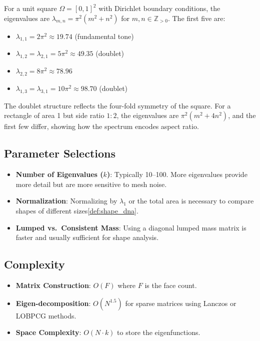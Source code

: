\begin{example}\label{example:shape_dna_square}
For a unit square $\Omega = [0,1]^2$ with Dirichlet boundary conditions, the eigenvalues are $\lambda_{m,n} = \pi^2(m^2 + n^2)$ for $m, n \in \mathbb{Z}_{>0}$. The first five are:
\begin{itemize}
  \item $\lambda_{1,1} = 2\pi^2 \approx 19.74$ (fundamental tone)
  \item $\lambda_{1,2} = \lambda_{2,1} = 5\pi^2 \approx 49.35$ (doublet)
  \item $\lambda_{2,2} = 8\pi^2 \approx 78.96$
  \item $\lambda_{1,3} = \lambda_{3,1} = 10\pi^2 \approx 98.70$ (doublet)
\end{itemize}
The doublet structure reflects the four-fold symmetry of the square. For a rectangle of area 1 but side ratio $1:2$, the eigenvalues are $\pi^2(m^2 + 4n^2)$, and the first few differ, showing how the spectrum encodes aspect ratio.
\end{example}

\subsection{Parameter Selections}
\begin{itemize}
  \item \textbf{Number of Eigenvalues ($k$)}: Typically 10--100. More eigenvalues provide more detail but are more sensitive to mesh noise.
  \item \textbf{Normalization}: Normalizing by $\lambda_1$ or the total area is necessary to compare shapes of different sizes\cref{def:shape_dna}.
  \item \textbf{Lumped vs.\ Consistent Mass}: Using a diagonal lumped mass matrix is faster and usually sufficient for shape analysis.
\end{itemize}

\subsection{Complexity}
\begin{itemize}
  \item \textbf{Matrix Construction}: $O(F)$ where $F$ is the face count.
  \item \textbf{Eigen-decomposition}: $O(N^{1.5})$ for sparse matrices using Lanczos or LOBPCG methods.
  \item \textbf{Space Complexity}: $O(N \cdot k)$ to store the eigenfunctions.
\end{itemize}

